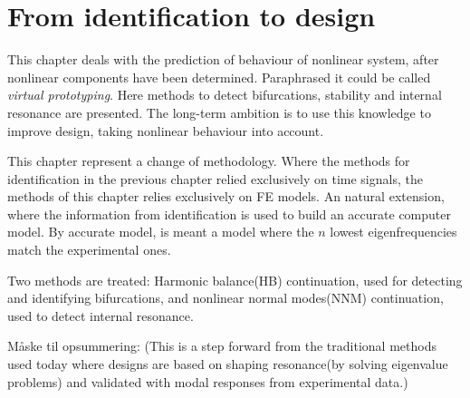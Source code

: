 
\chapter{From identification to design}
\label{chap:ident_to_design}

This chapter deals with the prediction of behaviour of nonlinear system, after
nonlinear components have been determined. Paraphrased it could be called
\textit{virtual prototyping}. Here methods to detect bifurcations, stability and
internal resonance are presented. The long-term ambition is to use this
knowledge to improve design, taking nonlinear behaviour into account.


This chapter represent a change of methodology. Where the methods for
identification in the previous chapter relied exclusively on time signals, the
methods of this chapter relies exclusively on FE models.
An natural extension, where the information from identification is used to build
an accurate computer model.
By accurate model, is meant a model where the $n$ lowest eigenfrequencies match
the experimental ones.


Two methods are treated: Harmonic balance(HB) continuation, used for detecting
and identifying bifurcations, and nonlinear normal modes(NNM) continuation, used
to detect internal resonance.


Måske til opsummering:
(This is a step forward from the traditional methods used today where designs are
based on shaping resonance(by solving eigenvalue problems) and validated with
modal responses from experimental data.)


